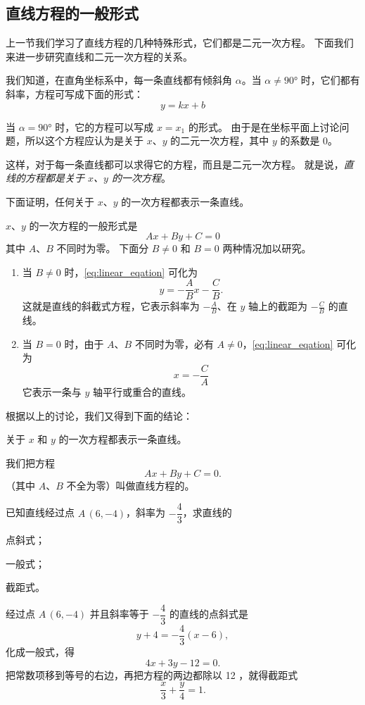 \subsection{直线方程的一般形式}
上一节我们学习了直线方程的几种特殊形式，它们都是二元一次方程。
下面我们来进一步研究直线和二元一次方程的关系。

我们知道，在直角坐标系中，每一条直线都有倾斜角 $\alpha$。当 $\alpha\neq\ang{90}$ 时，它们都有斜率，方程可写成下面的形式：
\[y = kx + b\]

当 $\alpha=\ang{90}$ 时，它的方程可以写成 $x=x_1$ 的形式。
由于是在坐标平面上讨论问题，所以这个方程应认为是关于 $x$、$y$ 的二元一次方程，其中 $y$ 的系数是 0。

这样，对于每一条直线都可以求得它的方程，而且是二元一次方程。
就是说，\emph{直线的方程都是关于 $x$、$y$ 的一次方程}。

下面证明，任何关于 $x$、$y$ 的一次方程都表示一条直线。

$x$、$y$ 的一次方程的一般形式是
\begin{equation}
  \label{eq:linear_eqation}
  Ax+By+C=0
\end{equation}
其中 $A$、$B$ 不同时为零。
下面分 $B\neq 0$ 和 $B=0$ 两种情况加以研究。
\begin{enumerate}
  \item 当 $B\neq 0$ 时，\cref{eq:linear_eqation} 可化为
  \[ y=-\frac{A}{B}x-\frac{C}{B}.\]
  这就是直线的斜截式方程，它表示斜率为 $-\frac{A}{B}$、在 $y$ 轴上的截距为 $-\frac{C}{B}$ 的直线。
  \item 当 $B=0$ 时，由于  $A$、$B$ 不同时为零，必有 $A\neq 0$，\cref{eq:linear_eqation} 可化为
  \[x=-\frac{C}{A}\]
  它表示一条与 $y$ 轴平行或重合的直线。
\end{enumerate}
根据以上的讨论，我们又得到下面的结论：

关于 $x$ 和 $y$ 的一次方程都表示一条直线。

我们把方程
\[Ax+By+C=0.\]
（其中 $A$、$B$ 不全为零）叫做直线方程的。

\begin{example}
  已知直线经过点 $A\,(6,-4)$，斜率为 $-\dfrac{4}{3}$，求直线的
  \begin{enumerate*} 
    \item 点斜式；
    \item 一般式；
    \item 截距式。
  \end{enumerate*}
\end{example}
\begin{solution}
  经过点 $A\,(6,-4)$ 并且斜率等于 $-\dfrac{4}{3}$ 的直线的点斜式是
  \[y+4=-\frac{4}{3}(x-6),\]
  化成一般式，得
  \[ 4x+3y-12= 0.\]
  把常数项移到等号的右边，再把方程的两边都除以 12 ，就得截距式
  \[ \frac{x}{3}+\frac{y}{4}=1.\]
\end{solution}

